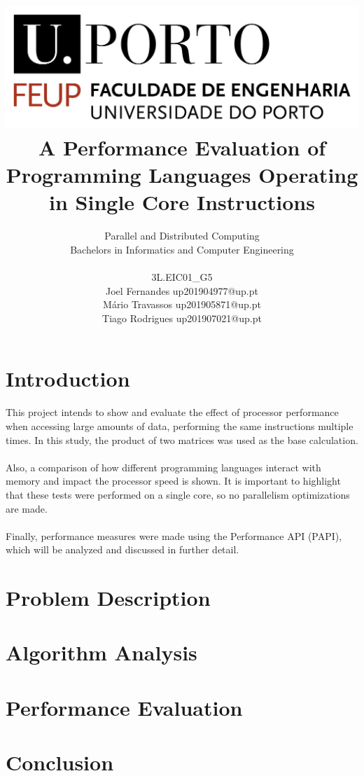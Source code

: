 \documentclass{report}
\title{\includegraphics[scale=0.3]{logo.png} \\ \textbf{A Performance Evaluation of Programming Languages Operating in Single Core Instructions}}
\author{Parallel and Distributed Computing \\ Bachelors in Informatics and Computer Engineering \\ \\ 3L.EIC01\_G5   \\ Joel Fernandes up201904977@up.pt \\ Mário Travassos up201905871@up.pt \\ Tiago Rodrigues up201907021@up.pt }
\begin{document}
    \maketitle

    \tableofcontents

    \section*{Introduction}

    \paragraph{}This project intends to show and evaluate the effect of processor performance when accessing large amounts of data, performing the same instructions multiple times. In this study, the product of two matrices was used as the base calculation.

    \paragraph{}Also, a comparison of how different programming languages interact with memory and impact the processor speed is shown. It is important to highlight that these tests were performed on a single core, so no parallelism optimizations are made.

    \paragraph{}Finally, performance measures were made using the Performance API (PAPI), which will be analyzed and discussed in further detail.

    \section*{Problem Description}

    \section*{Algorithm Analysis}

    \section*{Performance Evaluation}

    \section*{Conclusion}
\end{document}
